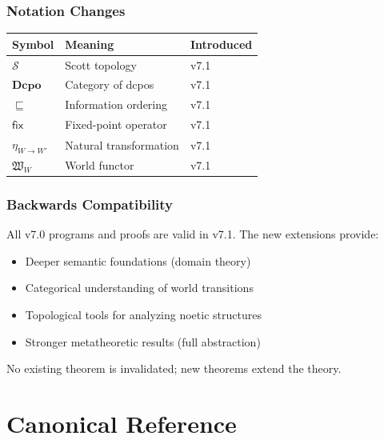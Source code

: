 \documentclass[11pt,twoside,openright]{book}
\theoremstyle{definition}
\theoremstyle{plain}
\theoremstyle{remark}
\newcommand{\Scott}{\mathscr{S}}           %
\newcommand{\Dcpo}{\mathbf{Dcpo}}          %
\newcommand{\sqleq}{\sqsubseteq}           %
\newcommand{\fix}{\mathsf{fix}}            %
\newcommand{\NatTrans}[2]{\eta_{#1 \to #2}}
\newcommand{\WorldFunctor}[1]{\mathfrak{W}_{#1}}
\begin{document}
\section*{Notation Changes}

\begin{center}
\begin{tabular}{lll}
\toprule
\textbf{Symbol} & \textbf{Meaning} & \textbf{Introduced} \\
\midrule
$\Scott$ & Scott topology & v7.1 \\
$\Dcpo$ & Category of dcpos & v7.1 \\
$\sqleq$ & Information ordering & v7.1 \\
$\fix$ & Fixed-point operator & v7.1 \\
$\NatTrans{W}{W'}$ & Natural transformation & v7.1 \\
$\WorldFunctor{W}$ & World functor & v7.1 \\
\bottomrule
\end{tabular}
\end{center}

\section*{Backwards Compatibility}

All v7.0 programs and proofs are valid in v7.1. The new extensions provide:
\begin{itemize}
  \item Deeper semantic foundations (domain theory)
  \item Categorical understanding of world transitions
  \item Topological tools for analyzing noetic structures
  \item Stronger metatheoretic results (full abstraction)
\end{itemize}

No existing theorem is invalidated; new theorems extend the theory.

\tableofcontents

\mainmatter

\part{Canonical Reference}
\end{document}
